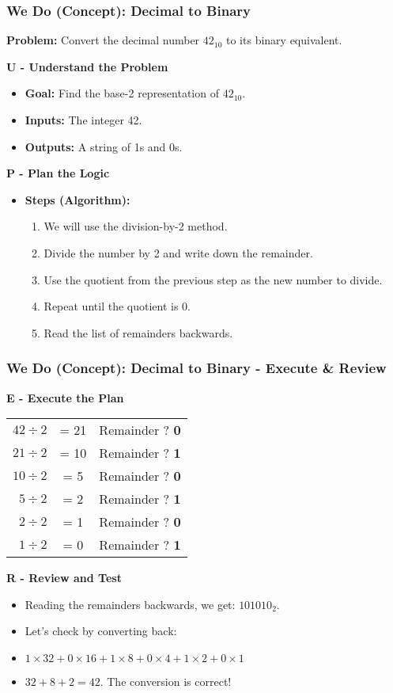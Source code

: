 \documentclass{beamer}
\begin{document}
\begin{frame}
\frametitle{We Do (Concept): Decimal to Binary}
\textbf{Problem:} Convert the decimal number \alert{$42_{10}$} to its binary equivalent.

\vfill
\textbf{U - Understand the Problem}
\begin{itemize}
    \item \textbf{Goal:} Find the base-2 representation of $42_{10}$.
    \item \textbf{Inputs:} The integer 42.
    \item \textbf{Outputs:} A string of 1s and 0s.
\end{itemize}
\pause
\textbf{P - Plan the Logic}
\begin{itemize}
    \item \textbf{Steps (Algorithm):}
    \begin{enumerate}
        \item We will use the \alert{division-by-2} method.
        \item Divide the number by 2 and write down the remainder.
        \item Use the quotient from the previous step as the new number to divide.
        \item Repeat until the quotient is 0.
        \item Read the list of remainders \alert{backwards}.
    \end{enumerate}
\end{itemize}
\end{frame}

\begin{frame}
\frametitle{We Do (Concept): Decimal to Binary - Execute \& Review}
\textbf{E - Execute the Plan}
\begin{tabular}{r c l}
 $42 \div 2$ & = 21 & Remainder \alert{?} \pause \textbf{0} \\
 $21 \div 2$ & = 10 & Remainder \alert{?} \pause \textbf{1} \\
 $10 \div 2$ & = 5  & Remainder \alert{?} \pause \textbf{0} \\
 $5 \div 2$  & = 2  & Remainder \alert{?} \pause \textbf{1} \\
 $2 \div 2$  & = 1  & Remainder \alert{?} \pause \textbf{0} \\
 $1 \div 2$  & = 0  & Remainder \alert{?} \pause \textbf{1} \\
\end{tabular}

\vfill
\pause
\textbf{R - Review and Test}
\begin{itemize}
    \item Reading the remainders backwards, we get: \alert{$101010_2$}.
    \item Let's check by converting back:
    \item $1 \times 32 + 0 \times 16 + 1 \times 8 + 0 \times 4 + 1 \times 2 + 0 \times 1$
    \item $32 + 8 + 2 = 42$. The conversion is correct!
\end{itemize}
\end{frame}
\end{document}
